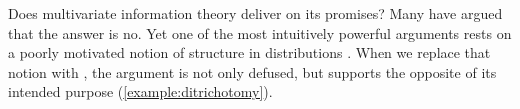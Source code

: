 {{}%
%
%
Does multivariate information theory deliver on its promises? 
Many have argued that the answer is no.
Yet one of the most intuitively powerful arguments rests on 
a poorly motivated notion
 of structure in distributions
\unskip. When
we replace that notion with \scibility, the
argument
is not only defused, but 
 supports the opposite of its intended purpose (\cref{example:ditrichotomy}).

}
